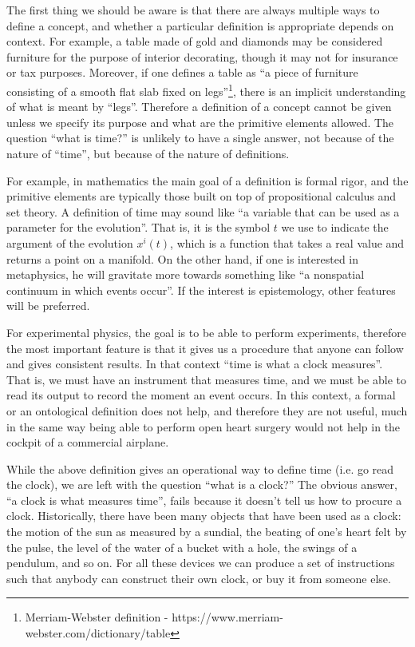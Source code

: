 \documentclass[10pt,twocolumn, nofootinbib]{revtex4-2}
\begin{document}
The first thing we should be aware is that there are always multiple ways to define a concept, and whether a particular definition is appropriate depends on context. For example, a table made of gold and diamonds may be considered furniture for the purpose of interior decorating, though it may not for insurance or tax purposes. Moreover, if one defines a table as ``a piece of furniture consisting of a smooth flat slab fixed on legs''\footnote{Merriam-Webster definition - https://www.merriam-webster.com/dictionary/table}, there is an implicit understanding of what is meant by ``legs''. Therefore a definition of a concept cannot be given unless we specify its purpose and what are the primitive elements allowed. The question ``what is time?'' is unlikely to have a single answer, not because of the nature of ``time'', but because of the nature of definitions.

For example, in mathematics the main goal of a definition is formal rigor, and the primitive elements are typically those built on top of propositional calculus and set theory. A definition of time may sound like ``a variable that can be used as a parameter for the evolution''. That is, it is the symbol $t$ we use to indicate the argument of the evolution $x^i(t)$, which is a function that takes a real value and returns a point on a manifold. On the other hand, if one is interested in metaphysics, he will gravitate more towards something like ``a nonspatial continuum in which events occur''. If the interest is epistemology, other features will be preferred.

For experimental physics, the goal is to be able to perform experiments, therefore the most important feature is that it gives us a procedure that anyone can follow and gives consistent results. In that context ``time is what a clock measures''. That is, we must have an instrument that measures time, and we must be able to read its output to record the moment an event occurs. In this context, a formal or an ontological definition does not help, and therefore they are not useful, much in the same way being able to perform open heart surgery would not help in the cockpit of a commercial airplane.

While the above definition gives an operational way to define time (i.e. go read the clock), we are left with the question ``what is a clock?'' The obvious answer, ``a clock is what measures time'', fails because it doesn't tell us how to procure a clock. Historically, there have been many objects that have been used as a clock: the motion of the sun as measured by a sundial, the beating of one's heart felt by the pulse, the level of the water of a bucket with a hole, the swings of a pendulum, and so on. For all these devices we can produce a set of instructions such that anybody can construct their own clock, or buy it from someone else.
\end{document}
